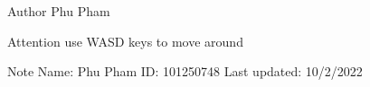 \begin{DoxyAuthor}{Author}
Phu Pham
\end{DoxyAuthor}
\begin{DoxyAttention}{Attention}
use WASD keys to move around
\end{DoxyAttention}
\begin{DoxyNote}{Note}
Name\+: Phu Pham ID\+: 101250748 Last updated\+: 10/2/2022 
\end{DoxyNote}
